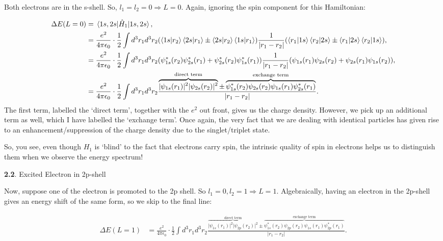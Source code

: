 \documentclass{article}
\numberwithin{equation}{section} %
\begin{document}
Both electrons are in the s-shell. So, $l_1=l_2=0 \Rightarrow L=0$. Again, ignoring the spin component for this Hamiltonian:

\begin{equation}
\begin{split}
\Delta E(L=0) &=\mel{1s,2s}{\hat{H}_1}{1s,2s},\\
&=\frac{e^2}{4\pi\epsilon_0}\cdot \frac{1}{2}\int d^3r_1d^3r_2 (\bra{1s}\ket{r_2}\bra{2s}\ket{r_1} \pm \bra{2s}\ket{r_2}\bra{1s}\ket{r_1})\frac{1}{\vert r_1-r_2\vert}(\bra{r_1}\ket{1s}\bra{r_2}\ket{2s} \pm \bra{r_1}\ket{2s}\bra{r_2}\ket{1s}),\\
&=\frac{e^2}{4\pi\epsilon_0}\cdot \frac{1}{2}\int d^3r_1d^3r_2 (\psi^*_{1s}(r_2)\psi^*_{2s}(r_1) + \psi^*_{2s}(r_2)\psi^*_{1s}(r_1))\frac{1}{\vert r_1-r_2\vert}(\psi_{1s}(r_1)\psi_{2s}(r_2) + \psi_{2s}(r_1)\psi_{1s}(r_2)),\\
&=\frac{e^2}{4\pi\epsilon_0}\cdot \frac{1}{2}\int d^3r_1d^3r_2 
\frac{\overbrace{\vert\psi_{1s}(r_1)\vert^2\vert\psi_{2s}(r_2)\vert^2}^{\text{direct term}} \pm \overbrace{\psi_{1s}^*(r_2)\psi_{2s}(r_2)\psi_{1s}(r_1)\psi^*_{2s}(r_1)}^{\text{exchange term}}}{\vert r_1-r_2\vert}.
\end{split}
\end{equation}
The first term, labelled the `direct term', together with the $e^2$ out front, gives us the charge density. However, we pick up an additional term as well, which I have labelled the `exchange term'. Once again, the very fact that we are dealing with identical particles has given rise to an enhancement/suppression of the charge density due to the singlet/triplet state.

So, you see, even though $H_1$ is `blind' to the fact that electrons carry spin, the intrinsic quality of spin in electrons helps us to distinguish them when we observe the energy spectrum!

\noindent\textbf{2.2}. Excited Electron in 2p-shell

Now, suppose one of the electron is promoted to the 2p shell. So $l_1=0, l_2=1 \Rightarrow L=1$. Algebraically, having an electron in the 2p-shell gives an energy shift of the same form, so we skip to the final line:

\begin{equation}
\begin{split}
\Delta E(L=1) &=\frac{e^2}{4\pi\epsilon_0}\cdot \frac{1}{2}\int d^3r_1d^3r_2 
\frac{\overbrace{\vert\psi_{1s}(r_1)\vert^2\vert\psi_{2p}(r_2)\vert^2}^{\text{direct term}} \pm \overbrace{\psi_{1s}^*(r_2)\psi_{2p}(r_2)\psi_{1s}(r_1)\psi^*_{2p}(r_1)}^{\text{exchange term}}}{\vert r_1-r_2\vert}.
\end{split}
\end{equation}
\end{document}
